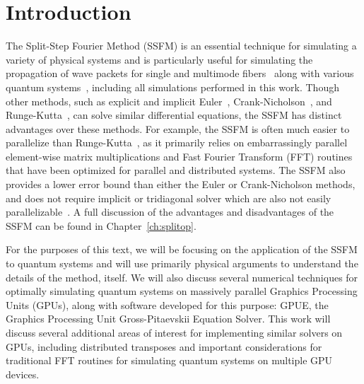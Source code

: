 \section*{Introduction}
The Split-Step Fourier Method (SSFM) is an essential technique for simulating a variety of physical systems and is particularly useful for simulating the propagation of wave packets for single and multimode fibers~\cite{agrawal2000, sinkin2003, meirelles2005, min2003} along with various quantum systems~\cite{bayindir2015, weideman1986, wang2005}, including all simulations performed in this work.
Though other methods, such as explicit and implicit Euler~\cite{butcher2016}, Crank-Nicholson~\cite{crank1947}, and Runge-Kutta~\cite{butcher2016}, can solve similar differential equations, the SSFM has distinct advantages over these methods.
For example, the SSFM is often much easier to parallelize than Runge-Kutta~\cite{brehler2017}, as it primarily relies on embarrassingly parallel element-wise matrix multiplications and Fast Fourier Transform (FFT) routines that have been optimized for parallel and distributed systems.
The SSFM also provides a lower error bound than either the Euler or Crank-Nicholson methods, and does not require implicit or tridiagonal solver \cite{conte2017, thomas1949} which are also not easily parallelizable~\cite{goddeke2010, wang1981, sweet1977}.
A full discussion of the advantages and disadvantages of the SSFM can be found in Chapter~\ref{ch:splitop}.

For the purposes of this text, we will be focusing on the application of the SSFM to quantum systems and will use primarily physical arguments to understand the details of the method, itself.
We will also discuss several numerical techniques for optimally simulating quantum systems on massively parallel Graphics Processing Units (GPUs), along with software developed for this purpose: GPUE, the Graphics Processing Unit Gross-Pitaevskii Equation Solver.
This work will discuss several additional areas of interest for implementing similar solvers on GPUs, including distributed transposes and important considerations for traditional FFT routines for simulating quantum systems on multiple GPU devices.

